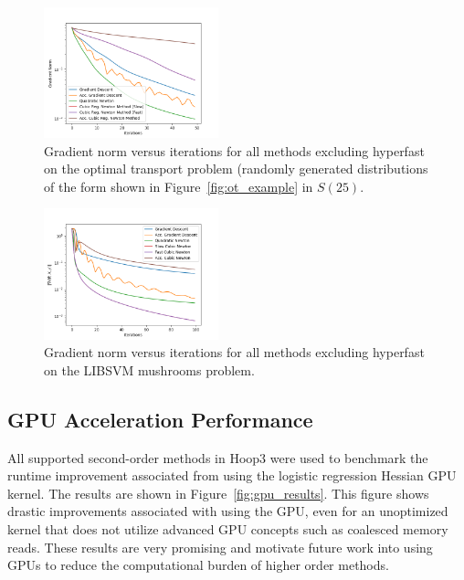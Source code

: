 \documentclass[journal]{IEEEtran}
\begin{document}
\begin{figure}
    \centering
    \includegraphics[width=0.45\textwidth]{img/ot_grad2.png}
    \caption{Gradient norm versus iterations for all methods excluding hyperfast on the optimal transport problem (randomly generated distributions of the form shown in Figure~\ref{fig:ot_example} in $S(25)$.}
    \label{fig:ot_grad}
\end{figure}

\begin{figure}
    \centering
    \includegraphics[width=0.45\textwidth]{img/libsvm_grad.png}
    \caption{Gradient norm versus iterations for all methods excluding hyperfast on the LIBSVM mushrooms problem.}
    \label{fig:libsvm_results}
\end{figure}

\subsection{GPU Acceleration Performance}
All supported second-order methods in Hoop3 were used to benchmark the runtime improvement associated from using the logistic regression Hessian GPU kernel. The results are shown in Figure~\ref{fig:gpu_results}. This figure shows drastic improvements associated with using the GPU, even for an unoptimized kernel that does not utilize advanced GPU concepts such as coalesced memory reads. These results are very promising and motivate future work into using GPUs to reduce the computational burden of higher order methods.
\end{document}
